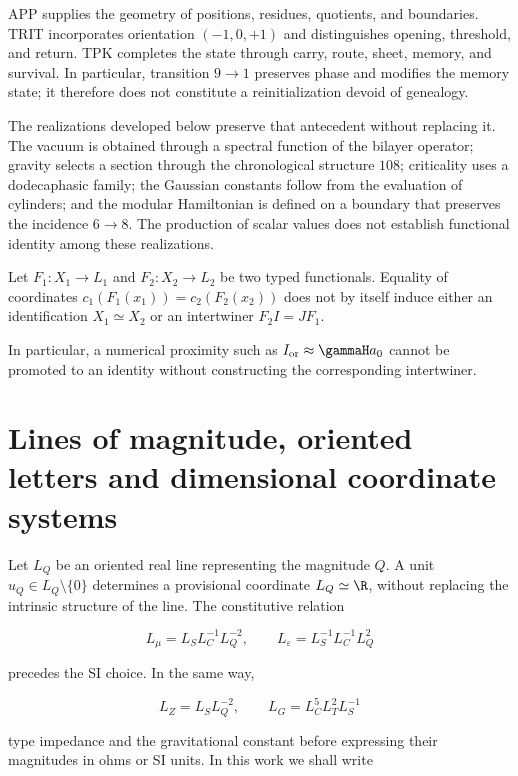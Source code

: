 APP supplies the geometry of positions, residues, quotients, and
boundaries. TRIT incorporates orientation \((-1,0,+1)\) and distinguishes
opening, threshold, and return. TPK completes the state through carry, route,
sheet, memory, and survival. In particular, transition \(9\to1\)
preserves phase and modifies the memory state; it therefore does not constitute
a reinitialization devoid of genealogy.

The realizations developed below preserve that antecedent without replacing it. The vacuum is obtained through a spectral function of the bilayer operator; gravity selects a section through the chronological structure \(108\); criticality uses a dodecaphasic family; the Gaussian constants follow from the evaluation of cylinders; and the modular Hamiltonian is defined on a boundary that preserves the incidence \(6\to8\). The production of scalar values does not establish functional identity among these realizations.

\begin{proposition}
Let \(F_1:X_1\to L_1\) and \(F_2:X_2\to L_2\) be two typed functionals. Equality of
coordinates \(c_1(F_1(x_1))=c_2(F_2(x_2))\) does not by itself induce either an
identification \(X_1\simeq X_2\) or an intertwiner
\(F_2I=JF_1\).
\end{proposition}

In particular, a numerical proximity such as
\(I_{\rm or}\approx\gammaH a_0\) cannot be promoted to an identity without
constructing the corresponding intertwiner.

\section{Lines of magnitude, oriented letters and dimensional coordinate systems}

Let \(L_Q\) be an oriented real line representing the magnitude \(Q\).
A unit \(u_Q\in L_Q\setminus\{0\}\) determines a
provisional coordinate \(L_Q\simeq\R\), without replacing the intrinsic structure of
the line. The constitutive relation

\[
L_\mu=L_S L_C^{-1}L_Q^{-2},\qquad
L_\varepsilon=L_S^{-1}L_C^{-1}L_Q^2
\]

precedes the SI choice. In the same way,

\[
L_Z=L_SL_Q^{-2},\qquad L_G=L_C^5L_T^2L_S^{-1}
\]

type impedance and the gravitational constant before expressing their magnitudes in
ohms or SI units. In this work we shall write

